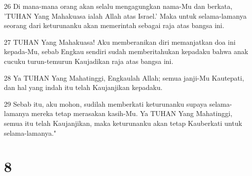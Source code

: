 \par 26 Di mana-mana orang akan selalu mengagungkan nama-Mu dan berkata, 'TUHAN Yang Mahakuasa ialah Allah atas Israel.' Maka untuk selama-lamanya seorang dari keturunanku akan memerintah sebagai raja atas bangsa ini.
\par 27 TUHAN Yang Mahakuasa! Aku memberanikan diri memanjatkan doa ini kepada-Mu, sebab Engkau sendiri sudah memberitahukan kepadaku bahwa anak cucuku turun-temurun Kaujadikan raja atas bangsa ini.
\par 28 Ya TUHAN Yang Mahatinggi, Engkaulah Allah; semua janji-Mu Kautepati, dan hal yang indah itu telah Kaujanjikan kepadaku.
\par 29 Sebab itu, aku mohon, sudilah memberkati keturunanku supaya selama-lamanya mereka tetap merasakan kasih-Mu. Ya TUHAN Yang Mahatinggi, semua itu telah Kaujanjikan, maka keturunanku akan tetap Kauberkati untuk selama-lamanya."

\chapter{8}

